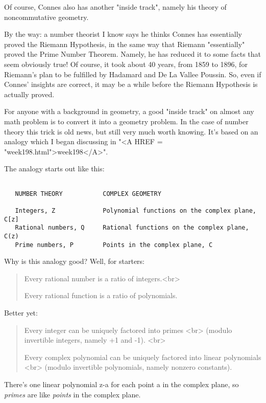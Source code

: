 Of course, Connes also has another "inside track", namely
his theory of noncommutative geometry.

By the way: a number theorist I know says he thinks Connes has
essentially proved the Riemann Hypothesis, in the same way that
Riemann "essentially" proved the Prime Number Theorem.
Namely, he has reduced it to some facts that seem obviously true!  Of
course, it took about 40 years, from 1859 to 1896, for Riemann's plan
to be fulfilled by Hadamard and De La Vallee Poussin.  So, even if
Connes' insights are correct, it may be a while before the Riemann
Hypothesis is actually proved.

For anyone with a background in geometry, a good "inside track" 
on almost any math problem is to convert it into a geometry problem.  
In the case of number theory this trick is old news, but still very much 
worth knowing.  It's based on an analogy which I began discussing in 
"<A HREF = "week198.html">week198</A>".  

The analogy starts out like this:

\begin{verbatim}

   NUMBER THEORY           COMPLEX GEOMETRY                               

   Integers, Z             Polynomial functions on the complex plane, C[z]
   Rational numbers, Q     Rational functions on the complex plane, C(z)
   Prime numbers, P        Points in the complex plane, C           

\end{verbatim}
    

Why is this analogy good?   Well, for starters:

\begin{quote}
   Every rational number is a ratio of integers.<br>

   Every rational function is a ratio of polynomials.  
\end{quote}
    
Better yet:

\begin{quote}
   Every integer can be uniquely factored into primes <br>
   (modulo invertible integers, namely +1 and -1). <br>

   Every complex polynomial can be uniquely factored into linear polynomials <br>
   (modulo invertible polynomials, namely nonzero constants).
\end{quote}
    
There's one linear polynomial z-a for each point a in the complex plane, 
so \emph{primes} are like \emph{points} in the complex plane. 


